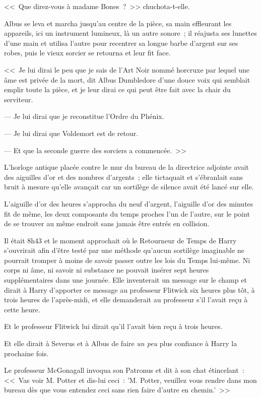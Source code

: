 <<~Que direz-vous à madame Bones~?~>> chuchota-t-elle.

Albus se leva et marcha jusqu'au centre de la pièce, sa main effleurant les appareils, ici un instrument lumineux, là un autre sonore~; il réajusta ses lunettes d'une main et utilisa l'autre pour recentrer sa longue barbe d'argent sur ses robes, puis le vieux sorcier se retourna et leur fit face.

<<~Je lui dirai le peu que je sais de l'Art Noir nommé horcruxe par lequel une âme est privée de la mort, dit Albus Dumbledore d'une douce voix qui semblait emplir toute la pièce, et je leur dirai ce qui peut être fait avec la chair du serviteur.

--- Je lui dirai que je reconstitue l'Ordre du Phénix.

--- Je lui dirai que Voldemort est de retour.

--- Et que la seconde guerre des sorciers a commencée.~>>


L'horloge antique placée contre le mur du bureau de la directrice adjointe avait des aiguilles d'or et des nombres d'argents~; elle tictaquait et s'ébranlait sans bruit à mesure qu'elle avançait car un sortilège de silence avait été lancé sur elle.

L'aiguille d'or des heures s'approcha du neuf d'argent, l'aiguille d'or des minutes fit de même, les deux composants du temps proches l'un de l'autre, sur le point de se trouver au même endroit sans jamais être entrés en collision.

Il était 8h43 et le moment approchait où le Retourneur de Temps de Harry s'ouvrirait afin d'être testé par une méthode qu'aucun sortilège imaginable ne pourrait tromper à moins de savoir passer outre les lois du Temps lui-même. Ni corps ni âme, ni savoir ni substance ne pouvait insérer sept heures supplémentaires dans une journée. Elle inventerait un message sur le champ et dirait à Harry d'apporter ce message au professeur Flitwick six heures plus tôt, à trois heures de l'après-midi, et elle demanderait au professeur s'il l'avait reçu à cette heure.

Et le professeur Flitwick lui dirait qu'il l'avait bien reçu à trois heures.

Et elle dirait à Severus et à Albus de faire \emph{un peu} plus confiance à Harry la prochaine fois.

Le professeur McGonagall invoqua son Patronus et dit à son chat étincelant~: <<~Vas voir M. Potter et dis-lui ceci~: 'M. Potter, veuillez vous rendre dans mon bureau dès que vous entendez ceci sans rien faire d'autre en chemin.'~>>

